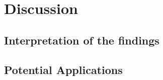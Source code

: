%
\chapter{Discussion}
\label{sec:discussion}

\section{Interpretation of the findings}
\label{sec:discussion:interpretation}

\section{Potential Applications}
\label{sec:discussion:application}